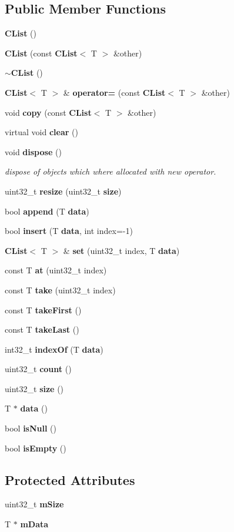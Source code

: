 \subsection*{Public Member Functions}
\begin{DoxyCompactItemize}
\item 
{\bf C\+List} ()
\item 
{\bf C\+List} (const {\bf C\+List}$<$ T $>$ \&other)
\item 
{\bf $\sim$\+C\+List} ()
\item 
{\bf C\+List}$<$ T $>$ \& {\bf operator=} (const {\bf C\+List}$<$ T $>$ \&other)
\item 
void {\bf copy} (const {\bf C\+List}$<$ T $>$ \&other)
\item 
virtual void {\bf clear} ()
\item 
void {\bf dispose} ()
\begin{DoxyCompactList}\small\item\em dispose of objects which where allocated with new operator. \end{DoxyCompactList}\item 
uint32\+\_\+t {\bf resize} (uint32\+\_\+t {\bf size})
\item 
bool {\bf append} (T {\bf data})
\item 
bool {\bf insert} (T {\bf data}, int index=-\/1)
\item 
{\bf C\+List}$<$ T $>$ \& {\bf set} (uint32\+\_\+t index, T {\bf data})
\item 
const T {\bf at} (uint32\+\_\+t index)
\item 
const T {\bf take} (uint32\+\_\+t index)
\item 
const T {\bf take\+First} ()
\item 
const T {\bf take\+Last} ()
\item 
int32\+\_\+t {\bf index\+Of} (T {\bf data})
\item 
uint32\+\_\+t {\bf count} ()
\item 
uint32\+\_\+t {\bf size} ()
\item 
T $\ast$ {\bf data} ()
\item 
bool {\bf is\+Null} ()
\item 
bool {\bf is\+Empty} ()
\end{DoxyCompactItemize}
\subsection*{Protected Attributes}
\begin{DoxyCompactItemize}
\item 
uint32\+\_\+t {\bf m\+Size}
\item 
T $\ast$ {\bf m\+Data}
\end{DoxyCompactItemize}


